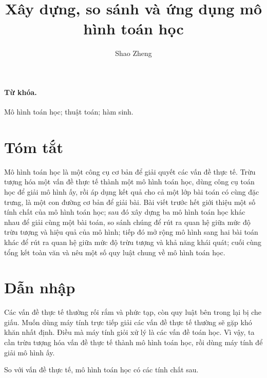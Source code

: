 \documentclass[11pt]{article}
\title{Xây dựng, so sánh và ứng dụng mô hình toán học}
\author{Shao Zheng}
\date{}
\begin{document}
\maketitle


\paragraph{Từ khóa.}
Mô hình toán học; thuật toán; hàm sinh.

\section*{Tóm tắt}

Mô hình toán học là một công cụ cơ bản để giải quyết các vấn đề thực tế. Trừu
tượng hóa một vấn đề thực tế thành một mô hình toán học, dùng công cụ toán
học để giải mô hình ấy, rồi áp dụng kết quả cho cả một lớp bài toán có cùng
đặc trưng, là một con đường cơ bản để giải bài. Bài viết trước hết giới thiệu
một số tính chất của mô hình toán học; sau đó xây dựng ba mô hình toán học
khác nhau để giải cùng một bài toán, so sánh chúng để rút ra quan hệ giữa mức
độ trừu tượng và hiệu quả của mô hình; tiếp đó mở rộng mô hình sang hai bài
toán khác để rút ra quan hệ giữa mức độ trừu tượng và khả năng khái quát; cuối
cùng tổng kết toàn văn và nêu một số quy luật chung về mô hình toán học.

\section{Dẫn nhập}

Các vấn đề thực tế thường rối rắm và phức tạp, còn quy luật bên trong lại bị
che giấu. Muốn dùng máy tính trực tiếp giải các vấn đề thực tế thường sẽ gặp
khó khăn nhất định. Điều mà máy tính giỏi xử lý là các vấn đề toán học. Vì
vậy, ta cần trừu tượng hóa vấn đề thực tế thành mô hình toán học, rồi dùng
máy tính để giải mô hình ấy.

So với vấn đề thực tế, mô hình toán học có các tính chất sau.
\end{document}
